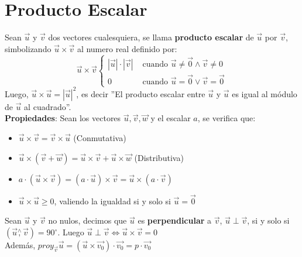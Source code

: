 \documentclass[11pt,a4paper]{article}
\begin{document}
\section{Producto Escalar}
\noindent Sean $\overrightarrow{u}$ y $\overrightarrow{v}$ dos vectores cualesquiera, se llama \textbf{producto escalar} de $\overrightarrow{u}$ por $\overrightarrow{v}$, simbolizando $\overrightarrow{u}\times\overrightarrow{v}$ al numero real definido por:
$$\overrightarrow{u}\times\overrightarrow{v}\left\{\begin{array}{ll}
|\overrightarrow{u}|\cdot|\overrightarrow{v}| & \text { cuando $\overrightarrow{u} \not = \overrightarrow{0} \land \overrightarrow{v}\not=0$}\\
0 & \text{ cuando $\overrightarrow{u} = \overrightarrow{0} \lor \overrightarrow{v} = \overrightarrow{0}$}
\end{array}\right.$$
Luego, $\overrightarrow{u}\times\overrightarrow{u} = |\overrightarrow{u}|^2$, es decir ”El producto escalar entre $\overrightarrow{u}$ y $\overrightarrow{u}$ es igual al módulo de $\overrightarrow{u}$ al cuadrado”.\\
\noindent \textbf{Propiedades}: Sean los vectores $\overrightarrow{u}, \overrightarrow{v}, \overrightarrow{w}$ y el escalar $a$, se verifica que:
\begin{itemize}
\item $\overrightarrow{u}\times\overrightarrow{v} = \overrightarrow{v}\times\overrightarrow{u}$ (Conmutativa)
\item $\overrightarrow{u}\times(\overrightarrow{v}+\overrightarrow{w}) = \overrightarrow{u}\times\overrightarrow{v} + \overrightarrow{u}\times\overrightarrow{w}$ (Distributiva)
\item $a\cdot(\overrightarrow{u}\times\overrightarrow{v}) = (a\cdot\overrightarrow{u})\times\overrightarrow{v} = \overrightarrow{u}\times(a\cdot\overrightarrow{v})$
\item $\overrightarrow{u}\times\overrightarrow{u} \geq 0$, valiendo la igualdad si y solo si $\overrightarrow{u} = \overrightarrow{0}$
\end{itemize}
\indent \indent Sean $\overrightarrow{u}$ y $\overrightarrow{v}$ no nulos, decimos que $\overrightarrow{u}$ es \textbf{perpendicular} a $\overrightarrow{v}$, $\overrightarrow{u}\perp\overrightarrow{v}$, si y solo si $(\overrightarrow{u}\overset{\wedge}{,}\overrightarrow{v}) = 90^\circ$. Luego $\overrightarrow{u}\perp\overrightarrow{v}\iff \overrightarrow{u}\times\overrightarrow{v}=0$\\
\indent Adem\'as, $proy_{\overrightarrow{v}}\overrightarrow{u} = (\overrightarrow{u}\times\overrightarrow{v_0})\cdot \overrightarrow{v_0} = p \cdot \overrightarrow{v_0}$
\end{document}
